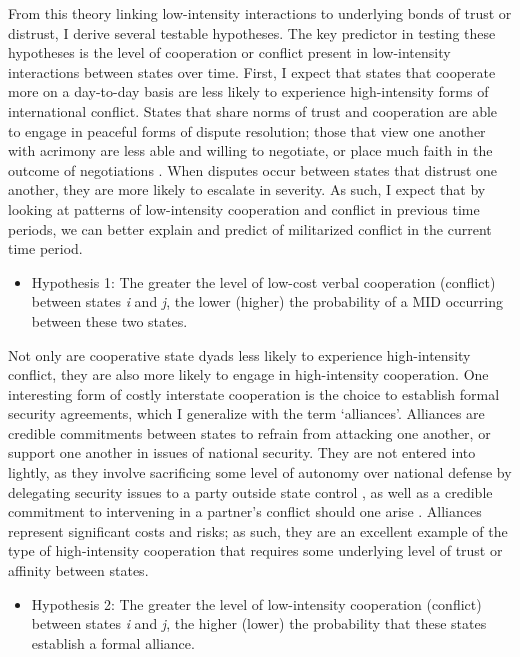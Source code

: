 \documentclass[10pt,]{article}
\providecommand{\tightlist}{%
  \setlength{\itemsep}{0pt}\setlength{\parskip}{0pt}}
\begin{document}
From this theory linking low-intensity interactions to underlying bonds
of trust or distrust, I derive several testable hypotheses. The key
predictor in testing these hypotheses is the level of cooperation or
conflict present in low-intensity interactions between states over time.
First, I expect that states that cooperate more on a day-to-day basis
are less likely to experience high-intensity forms of international
conflict. States that share norms of trust and cooperation are able to
engage in peaceful forms of dispute resolution; those that view one
another with acrimony are less able and willing to negotiate, or place
much faith in the outcome of negotiations
\citep[500-502]{RisseKappen1995}. When disputes occur between states
that distrust one another, they are more likely to escalate in severity.
As such, I expect that by looking at patterns of low-intensity
cooperation and conflict in previous time periods, we can better explain
and predict of militarized conflict in the current time period.

\begin{itemize}
\tightlist
\item
  Hypothesis 1: The greater the level of low-cost verbal cooperation
  (conflict) between states \emph{i} and \emph{j}, the lower (higher)
  the probability of a MID occurring between these two states.
\end{itemize}

Not only are cooperative state dyads less likely to experience
high-intensity conflict, they are also more likely to engage in
high-intensity cooperation. One interesting form of costly interstate
cooperation is the choice to establish formal security agreements, which
I generalize with the term `alliances'. Alliances are credible
commitments between states to refrain from attacking one another, or
support one another in issues of national security. They are not entered
into lightly, as they involve sacrificing some level of autonomy over
national defense by delegating security issues to a party outside state
control \citep[904-905]{Morrow1991}, as well as a credible commitment to
intervening in a partner's conflict should one arise
\citep[317-318]{Smith1998}. Alliances represent significant costs and
risks; as such, they are an excellent example of the type of
high-intensity cooperation that requires some underlying level of trust
or affinity between states.

\begin{itemize}
\tightlist
\item
  Hypothesis 2: The greater the level of low-intensity cooperation
  (conflict) between states \emph{i} and \emph{j}, the higher (lower)
  the probability that these states establish a formal alliance.
\end{itemize}
\end{document}
